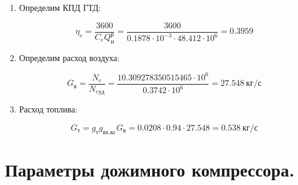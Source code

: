 \documentclass[a4paper,10pt]{article}
\begin{document}
\begin{enumerate}
	\item Определим КПД ГТД:
	
	\[
	\eta_e = \frac{ 3600 }{ C_e Q_н^р } = 
			\frac{ 3600 }{ 0.1878 \cdot 10^{-3} \cdot 48.412 \cdot 10^6} 
	= 0.3959
	\]
	
	\item Определим расход воздуха:
	
	\[
	G_в = \frac{N_e}{N_{e уд} } = 
	\frac{ 10.309278350515465 \cdot 10^6 }{ 0.3742 \cdot 10^6 } = 
	27.548\ кг/с
	\]

	\item Расход топлива:

	\[
		G_{т} = g_т g_{вх.кс} G_в = 0.0208 \cdot 0.94
		\cdot 27.548 =
		0.538\ кг/с
	\]

\end{enumerate}




    \section{Параметры дожимного компрессора.}
\end{document}
